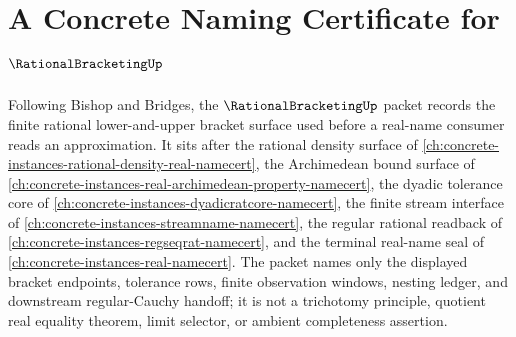 \chapter{A Concrete Naming Certificate for $\RationalBracketingUp$}
\label{ch:concrete-instances-rational-bracketing-namecert}

Following Bishop and Bridges, the $\RationalBracketingUp$ packet records the finite rational lower-and-upper bracket surface used before a real-name consumer reads an approximation. It sits after the rational density surface of \autoref{ch:concrete-instances-rational-density-real-namecert}, the Archimedean bound surface of \autoref{ch:concrete-instances-real-archimedean-property-namecert}, the dyadic tolerance core of \autoref{ch:concrete-instances-dyadicratcore-namecert}, the finite stream interface of \autoref{ch:concrete-instances-streamname-namecert}, the regular rational readback of \autoref{ch:concrete-instances-regseqrat-namecert}, and the terminal real-name seal of \autoref{ch:concrete-instances-real-namecert}. The packet names only the displayed bracket endpoints, tolerance rows, finite observation windows, nesting ledger, and downstream regular-Cauchy handoff; it is not a trichotomy principle, quotient real equality theorem, limit selector, or ambient completeness assertion.

